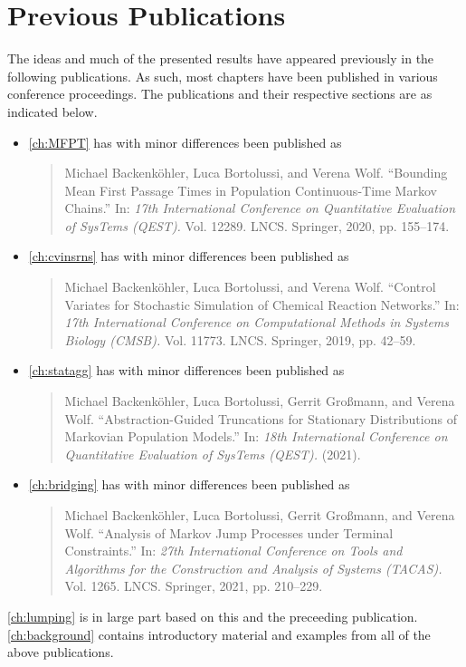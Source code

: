 \section{Previous Publications}%
The ideas and much of the presented results have appeared previously in the following publications.
As such, most chapters have been published in various conference proceedings.
The publications and their respective sections are as indicated below.

\begin{itemize}

\item \autoref{ch:MFPT} has with minor differences been published as
\begin{quote}
	Michael Backenköhler, Luca Bortolussi, and Verena
Wolf. ``Bounding Mean First Passage Times in
	Population Con\-tin\-uo\-us-Time Markov Chains.'' In: \emph{17th
International Conference on Quantitative Evaluation of
	SysTems (QEST).} Vol. 12289. LNCS. Springer, 2020,
pp. 155--174.
\end{quote}

\item \autoref{ch:cvinsrns} has with minor differences been published as
\begin{quote}
	Michael Backenköhler, Luca Bortolussi, and Verena
Wolf. ``Control Variates for Stochastic Simulation of
	Chemical Reaction Networks.'' In: \emph{17th International
	Conference on Computational Methods in Systems Biology (CMSB).} Vol. 11773. LNCS. Springer, 2019,
pp. 42--59.
\end{quote}

\item \autoref{ch:statagg} has with minor differences been published as
\begin{quote}
	Michael Backenköhler, Luca Bortolussi, Gerrit Großmann, and Verena Wolf. ``Abstraction-Guided Truncations
for Stationary Distributions of Markovian
	Population Models.'' In: \emph{18th
International Conference on Quantitative Evaluation of
	SysTems (QEST).} (2021).
\end{quote}

	\item \autoref{ch:bridging} has with minor differences been published as

\begin{quote}
	Michael Backenköhler, Luca Bortolussi, Gerrit Großmann, and Verena Wolf.
	``Analysis of Markov Jump Processes under Terminal Constraints.''
	In: \emph{27th International Conference on Tools and Algorithms for
	the Construction and Analysis of Systems (TACAS).}  Vol. 1265. LNCS.
	Springer, 2021, pp. 210--229.
\end{quote}
\end{itemize}
\autoref{ch:lumping} is in large part based on this and the preceeding publication.
\autoref{ch:background} contains introductory material and examples from all of the above publications.

